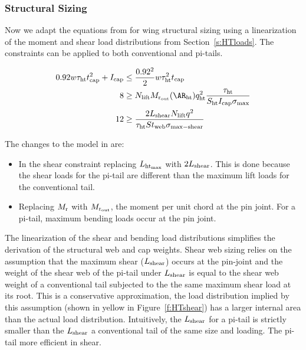 \subsubsection{Structural Sizing}

Now we adapt the equations from \cite{gp_ac_design} for wing structural sizing using
a linearization of the moment and shear load distributions from Section~\ref{s:HTloads}. The
constraints can be applied to both conventional and pi-tails.

\begin{align}
    0.92 w\tau_{\rm{ht}} t_{\rm{cap}}^2 + I_{\rm{cap}} &\leq \frac{0.92^2}{2}w\tau_{\rm{ht}}^2t_{\rm{cap}}\\
    8 &\geq N_{\rm{lift}}M_{\rm{r}_{\rm{out}}}(\AR_{\rm{ht}})q_{\rm{ht}}^2\frac{\tau_{\rm{ht}}}{S_{\rm{ht}} I_{\rm{cap}}\sigma_{\rm{max}}}\\
    12 &\geq \frac{2L_{\rm{shear}} N_{\rm{lift}} q^2}{\tau_{\rm{ht}} S t_{\rm{web}} \sigma_{\rm{max-shear}}}
\end{align}

The changes to the model in \cite{gp_ac_design} are:
\begin{itemize}
    \item In the shear constraint replacing $L_{\rm{ht}_{\rm{max}}}$ with $2L_{\rm{shear}}$. 
This is done because the shear loads for the pi-tail are different than the 
maximum lift loads for the conventional tail. 
    \item Replacing $M_{\rm{r}}$ with $M_{\rm{r}_{\rm{out}}}$, the moment per unit chord at the 
pin joint. For a pi-tail, maximum bending loads occur at the pin joint.
\end{itemize}

The linearization of the shear and bending load distributions simplifies the 
derivation of the structural web and cap weights. Shear web sizing relies on the 
assumption that the maximum shear ($L_{\rm{shear}}$) occurs at the pin-joint and the 
weight of the shear web of the pi-tail under $L_{\rm{shear}}$ is equal to the shear 
web weight of a conventional tail subjected to the the same maximum shear load 
at its root. This is a conservative approximation, the load distribution implied 
by this assumption (shown in yellow in Figure~\ref{f:HTshear}) has a larger
internal area than the actual load distribution. Intuitively, the $L_{\rm{shear}}$ 
for a pi-tail is strictly smaller than the $L_{\rm{shear}}$ a conventional tail of 
the same size and loading. The pi-tail more efficient in shear.

